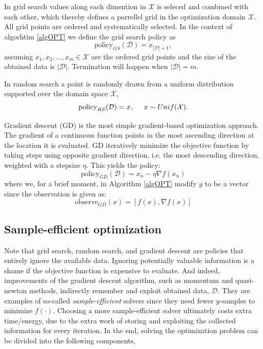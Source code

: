 \begin{testexample}
    In grid search values along each dimention in $\mathcal{X}$ is seleced and combined with each
    other, which thereby defines a parrellel grid in the optimization domain $\mathcal{X}$. All
    grid points are ordered and systematically selected. In the context of algorhtim \ref{algOPT} we define
    the grid search policy as 
    $$\text{policy}_{GS}(\mathcal{D}) = x_{|\mathcal{D}|+1},$$
    assuming $x_1,x_2, \dots, x_{m} \in \mathcal{X}$ are the ordered grid points and the size of the obtained 
    data is $|\mathcal{D}|$. Termination will happen when $|\mathcal{D}| = m$.
\end{testexample}
\begin{testexample}
    In random search a point is randomly drawn from a uniform distribution supported over the domain
    space $\mathcal{X}$, 
    $$\text{policy}_{RS}(\mathcal{D}) = x, \hspace{0.5cm} x \sim Unif(\mathcal{X}).$$
\end{testexample}
\begin{testexample}
    Gradient descent (GD) is the most simple gradient-based optimization approach. The gradient of a
    continuous function points in the most ascending direction at the location it is evaluated. GD
    iteratively minimize the objective function by taking steps using opposite gradient direction,
    i.e. the most descending direction, weighted with a stepsize $\eta$. This yields the policy:
    $$\text{policy}_{GD}(\mathcal{D}) = x_n - \eta \nabla f(x_n)$$
    where we, for a brief moment, in Algorithm \eqref{algOPT} modify $y$ to be a vector since the observation 
    is given as:
    $$\text{observe}_{GD}(x) = [f(x), \nabla f(x)]$$
\end{testexample}

\subsection{Sample-efficient optimization}
Note that grid search, random search, and gradient descent are policies that entirely ignore the
available data. Ignoring potentially valuable information is a shame if the objective function is
expensive to evaluate. And indeed, improvements of the gradient descent algorithm, such as momentum
and quasi-newton methods, indirectly remember and exploit obtained data, $\mathcal{D}$. They are
examples of so-called \textit{sample-efficient} solvers since they need fewer $y$-samples to
minimize $f(\cdot)$. Choosing a more sample-efficient solver ultimately costs extra time/energy, due
to the extra work of storing and exploiting the collected information for every iteration. In the
end, solving the optimization problem can be divided into the following components, 

